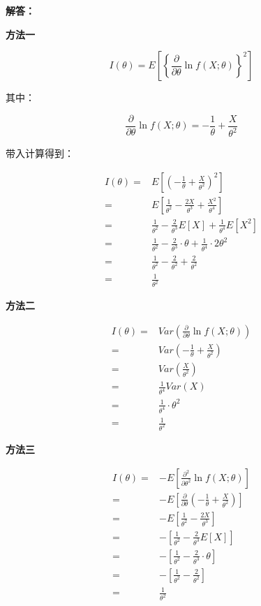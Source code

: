 \documentclass[12pt,a4paper]{article}
\begin{document}
\begin{answerbox}
\textbf{解答：}

\textbf{方法一}

$$
I(\theta) = E\left[\left\{\frac{\partial}{\partial \theta} \ln f(X; \theta)\right\}^2\right]
$$

其中：

$$
\frac{\partial}{\partial \theta} \ln f(X; \theta) = -\frac{1}{\theta} + \frac{X}{\theta^2} 
$$

带入计算得到：

$$
\begin{aligned}
I(\theta) = & E\left[\left(-\frac{1}{\theta} + \frac{X}{\theta^2}\right)^2\right] \\  
= & E\left[\frac{1}{\theta^2} - \frac{2X}{\theta^3} + \frac{X^2}{\theta^4}\right] \\
= & \frac{1}{\theta^2} - \frac{2}{\theta^3} E[X] + \frac{1}{\theta^4} E[X^2] \\
= & \frac{1}{\theta^2} - \frac{2}{\theta^3} \cdot \theta + \frac{1}{\theta^4} \cdot 2\theta^2 \\
= & \frac{1}{\theta^2} - \frac{2}{\theta^2} + \frac{2}{\theta^2} \\
= & \frac{1}{\theta^2}
\end{aligned}
$$

\textbf{方法二}

$$
\begin{aligned}
 I(\theta) = &Var\left(\frac{\partial}{\partial \theta} \ln f(X; \theta)\right)\\
= & Var\left(-\frac{1}{\theta} + \frac{X}{\theta^2}\right) \\
= & Var\left(\frac{X}{\theta^2}\right) \\
= & \frac{1}{\theta^4} Var(X) \\
= & \frac{1}{\theta^4} \cdot \theta^2 \\
= & \frac{1}{\theta^2}
\end{aligned}
$$

\textbf{方法三}

$$
\begin{aligned}
I(\theta) = & -E\left[\frac{\partial^2}{\partial \theta^2} \ln f(X; \theta)\right] \\
= & -E\left[\frac{\partial}{\partial \theta} \left(-\frac{1}{\theta} + \frac{X}{\theta^2}\right)\right] \\
= & -E\left[\frac{1}{\theta^2} - \frac{2X}{\theta^3}\right] \\
= & -\left[\frac{1}{\theta^2} - \frac{2}{\theta^3} E[X]\right] \\
= & -\left[\frac{1}{\theta^2} - \frac{2}{\theta^3} \cdot \theta\right] \\
= & -\left[\frac{1}{\theta^2} - \frac{2}{\theta^2}\right] \\
= & \frac{1}{\theta^2}
\end{aligned}
$$
\end{answerbox}
\end{document}
